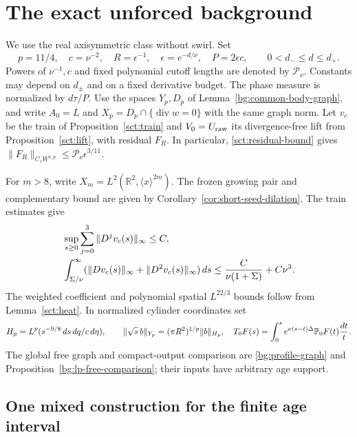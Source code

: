 \section{The exact unforced background}
\label{short-bg:section}

We use the real axisymmetric class without swirl.  Set
\[
 p=11/4,\quad c=\nu^{-2},\quad R=\epsilon^{-1},\quad
 \epsilon=e^{-d/\nu},\quad P=2\epsilon c,
 \qquad 0<d_-\le d\le d_+.
\]
Powers of $\nu^{-1},c$ and fixed polynomial cutoff lengths are denoted
by $\mathcal P_\nu$. Constants may depend on $d_\pm$ and on a fixed
derivative budget. The phase measure is normalized by $d\tau/P$.
Use the spaces $Y_p,D_p$ of Lemma~\ref{bg:common-body-graph}, and write
$A_0=L$ and $X_p=D_p\cap\{\operatorname{div}w=0\}$ with the same graph
norm. Let $v_c$ be the train of Proposition~\ref{sct:train} and
$V_0=U_{\rm raw}$ its divergence-free lift from Proposition~\ref{sct:lift},
with residual $F_R$. In particular,
\eqref{sct:residual-bound} gives
$\|F_R\|_{C_\tau W^{1,p}}\le\mathcal P_\nu\epsilon^{3/11}$.

For $m>8$, write $X_m=L^2(\mathbb R^2,\langle x\rangle^{2m})$.
The frozen growing pair and complementary bound are given by
Corollary~\ref{cor:short-seed-dilation}. The train estimates give
\begin{align}
 &\sup_{s\ge0}\sum_{j=0}^3\|D^jv_c(s)\|_\infty\le C,
 \label{short-bg:train-uniform}\\
 &\int_{\Sigma/\nu}^\infty
       (\|Dv_c(s)\|_\infty+\|D^2v_c(s)\|_\infty)\,ds
 \le {C\over\nu(1+\Sigma)}+C\nu^3.
 \label{short-bg:train-late}
\end{align}
The weighted coefficient and polynomial spatial $L^{22/3}$ bounds follow
from Lemma~\ref{sct:heat}. In normalized cylinder coordinates set
\begin{equation}
 H_p=L^p(s^{-9/8}\,ds\,dq/c\,d\eta),\qquad
 \|\sqrt{s}\,b\|_{Y_p}=(\pi R^2)^{1/p}\|b\|_{H_p},
 \quad
 T_0F(s)=\int_0^s e^{\nu(s-t)\Delta}\mathbb P_0 F(t){dt\over t}.
 \label{short-bg:measure}
\end{equation}
The global free graph and compact-output comparison are
\eqref{bg:profile-graph} and Proposition~\ref{bg:lp-free-comparison};
their inputs have arbitrary age support.

\subsection{One mixed construction for the finite age interval}

